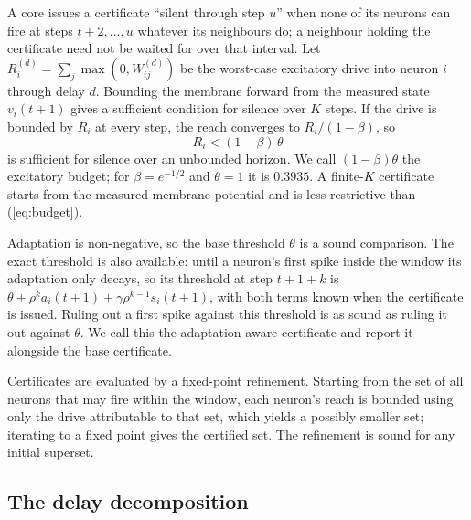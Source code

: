 \documentclass{iopjournal}
\begin{document}
A core issues a certificate ``silent through step $u$'' when none of its neurons can fire at steps $t+2,\dots,u$ whatever its neighbours do; a neighbour holding the certificate need not be waited for over that interval. Let $R^{(d)}_i = \sum_j \max(0, W^{(d)}_{ij})$ be the worst-case excitatory drive into neuron $i$ through delay $d$. Bounding the membrane forward from the measured state $v_i(t+1)$ gives a sufficient condition for silence over $K$ steps. If the drive is bounded by $R_i$ at every step, the reach converges to $R_i/(1-\beta)$, so
\begin{equation}
R_i < (1-\beta)\,\theta
\label{eq:budget}
\end{equation}
is sufficient for silence over an unbounded horizon. We call $(1-\beta)\theta$ the excitatory budget; for $\beta=e^{-1/2}$ and $\theta=1$ it is $0.3935$. A finite-$K$ certificate starts from the measured membrane potential and is less restrictive than (\ref{eq:budget}).

Adaptation is non-negative, so the base threshold $\theta$ is a sound comparison. The exact threshold is also available: until a neuron's first spike inside the window its adaptation only decays, so its threshold at step $t+1+k$ is $\theta + \rho^k a_i(t+1) + \gamma\rho^{k-1} s_i(t+1)$, with both terms known when the certificate is issued. Ruling out a first spike against this threshold is as sound as ruling it out against $\theta$. We call this the adaptation-aware certificate and report it alongside the base certificate.

Certificates are evaluated by a fixed-point refinement. Starting from the set of all neurons that may fire within the window, each neuron's reach is bounded using only the drive attributable to that set, which yields a possibly smaller set; iterating to a fixed point gives the certified set. The refinement is sound for any initial superset.

\subsection{The delay decomposition}
\label{sec:decomposition}
\end{document}
